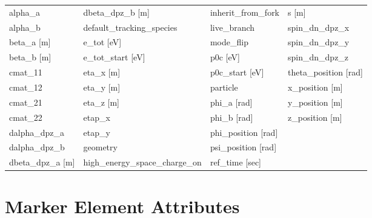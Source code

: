  \begin{tabular}{llll} \toprule
alpha_a                          & dbeta_dpz_b [m]                  & inherit_from_fork                & s [m]                            \\
alpha_b                          & default_tracking_species         & live_branch                      & spin_dn_dpz_x                    \\
beta_a [m]                       & e_tot [eV]                       & mode_flip                        & spin_dn_dpz_y                    \\
beta_b [m]                       & e_tot_start [eV]                 & p0c [eV]                         & spin_dn_dpz_z                    \\
cmat_11                          & eta_x [m]                        & p0c_start [eV]                   & theta_position [rad]             \\
cmat_12                          & eta_y [m]                        & particle                         & x_position [m]                   \\
cmat_21                          & eta_z [m]                        & phi_a [rad]                      & y_position [m]                   \\
cmat_22                          & etap_x                           & phi_b [rad]                      & z_position [m]                   \\
dalpha_dpz_a                     & etap_y                           & phi_position [rad]               &                                  \\
dalpha_dpz_b                     & geometry                         & psi_position [rad]               &                                  \\
dbeta_dpz_a [m]                  & high_energy_space_charge_on      & ref_time [sec]                   &                                  \\
 \bottomrule
 \end{tabular}
 \vfill
 
 \section{Marker Element Attributes}
 \label{s:list.marker}
 

